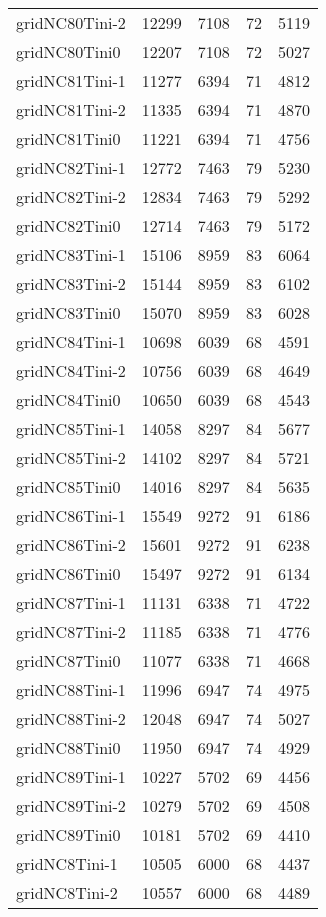 \begin{longtable}{lrrrr}
gridNC80Tini-2 & 12299 & 7108 & 72 & 5119 \\
gridNC80Tini0 & 12207 & 7108 & 72 & 5027 \\
gridNC81Tini-1 & 11277 & 6394 & 71 & 4812 \\
gridNC81Tini-2 & 11335 & 6394 & 71 & 4870 \\
gridNC81Tini0 & 11221 & 6394 & 71 & 4756 \\
gridNC82Tini-1 & 12772 & 7463 & 79 & 5230 \\
gridNC82Tini-2 & 12834 & 7463 & 79 & 5292 \\
gridNC82Tini0 & 12714 & 7463 & 79 & 5172 \\
gridNC83Tini-1 & 15106 & 8959 & 83 & 6064 \\
gridNC83Tini-2 & 15144 & 8959 & 83 & 6102 \\
gridNC83Tini0 & 15070 & 8959 & 83 & 6028 \\
gridNC84Tini-1 & 10698 & 6039 & 68 & 4591 \\
gridNC84Tini-2 & 10756 & 6039 & 68 & 4649 \\
gridNC84Tini0 & 10650 & 6039 & 68 & 4543 \\
gridNC85Tini-1 & 14058 & 8297 & 84 & 5677 \\
gridNC85Tini-2 & 14102 & 8297 & 84 & 5721 \\
gridNC85Tini0 & 14016 & 8297 & 84 & 5635 \\
gridNC86Tini-1 & 15549 & 9272 & 91 & 6186 \\
gridNC86Tini-2 & 15601 & 9272 & 91 & 6238 \\
gridNC86Tini0 & 15497 & 9272 & 91 & 6134 \\
gridNC87Tini-1 & 11131 & 6338 & 71 & 4722 \\
gridNC87Tini-2 & 11185 & 6338 & 71 & 4776 \\
gridNC87Tini0 & 11077 & 6338 & 71 & 4668 \\
gridNC88Tini-1 & 11996 & 6947 & 74 & 4975 \\
gridNC88Tini-2 & 12048 & 6947 & 74 & 5027 \\
gridNC88Tini0 & 11950 & 6947 & 74 & 4929 \\
gridNC89Tini-1 & 10227 & 5702 & 69 & 4456 \\
gridNC89Tini-2 & 10279 & 5702 & 69 & 4508 \\
gridNC89Tini0 & 10181 & 5702 & 69 & 4410 \\
gridNC8Tini-1 & 10505 & 6000 & 68 & 4437 \\
gridNC8Tini-2 & 10557 & 6000 & 68 & 4489 \\

\end{longtable}
